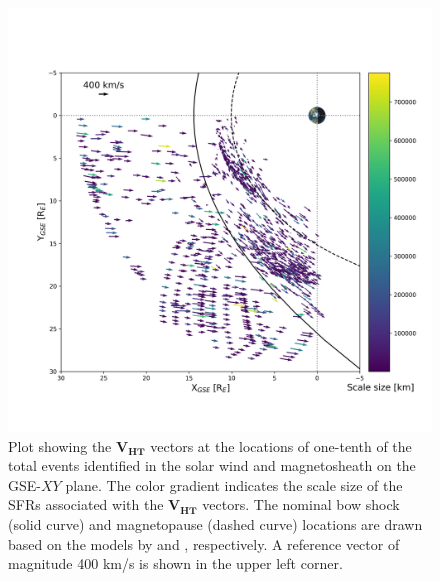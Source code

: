 \begin{figure}
    \centering
    \includegraphics[width=\textwidth]{Figures/Orbits/VHT_xy_scalesize.png}
    \caption[Orbit plot of flow vectors associated with the SFRs, in relation to their scale size]{Plot showing the $\mathbf{V_{HT}}$ vectors at the locations of one-tenth of the total events identified in the solar wind and magnetosheath on the GSE-$XY$ plane. The color gradient indicates the scale size of the SFRs associated with the $\mathbf{V_{HT}}$ vectors. The nominal bow shock (solid curve) and magnetopause (dashed curve) locations are drawn based on the models by \citet{Shue:1997} and \citet{SlavinHolzer:1984}, respectively. A reference vector of magnitude 400 km/s is shown in the upper left corner.}
    \label{fig:VHT-scalesize}
\end{figure}


